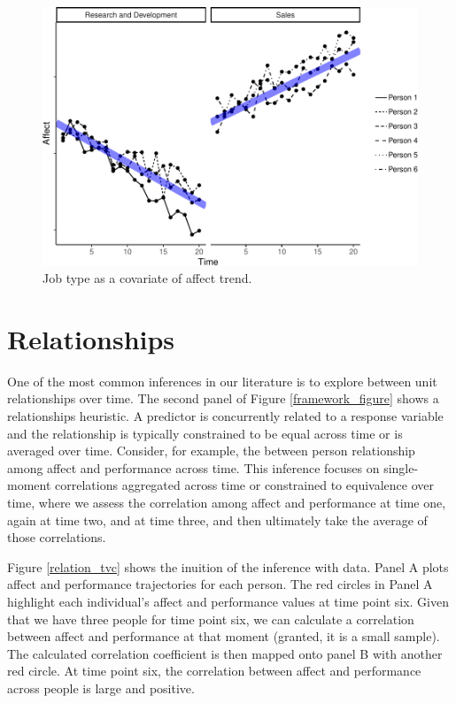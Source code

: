 \documentclass[english,,man]{apa6}
\theoremstyle{definition}
\theoremstyle{definition}
\theoremstyle{definition}
\theoremstyle{remark}
\begin{document}
\begin{figure}
\centering
\includegraphics{figures/unnamed-chunk-11-1.pdf}
\caption{\label{fig:unnamed-chunk-11}Job type as a covariate of affect
trend.\label{trend_covariate}}
\end{figure}

\hypertarget{relationships}{%
\section{Relationships}\label{relationships}}

One of the most common inferences in our literature is to explore
between unit relationships over time. The second panel of Figure
\ref{framework_figure} shows a relationships heuristic. A predictor is
concurrently related to a response variable and the relationship is
typically constrained to be equal across time or is averaged over time.
Consider, for example, the between person relationship among affect and
performance across time. This inference focuses on single-moment
correlations aggregated across time or constrained to equivalence over
time, where we assess the correlation among affect and performance at
time one, again at time two, and at time three, and then ultimately take
the average of those correlations.

Figure \ref{relation_tvc} shows the inuition of the inference with data.
Panel A plots affect and performance trajectories for each person. The
red circles in Panel A highlight each individual's affect and
performance values at time point six. Given that we have three people
for time point six, we can calculate a correlation between affect and
performance at that moment (granted, it is a small sample). The
calculated correlation coefficient is then mapped onto panel B with
another red circle. At time point six, the correlation between affect
and performance across people is large and positive.
\end{document}
